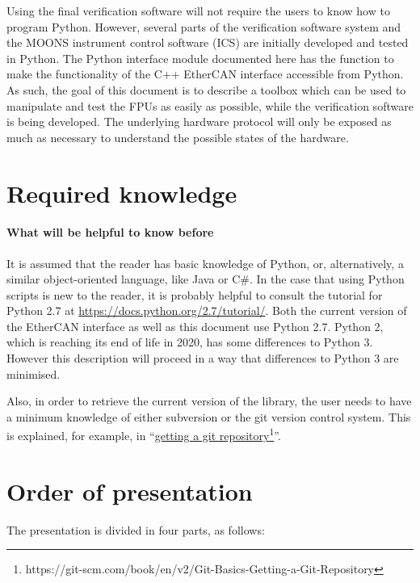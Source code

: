 \documentclass[fontsize=12,a4paper]{scrreprt}
\begin{document}
Using the final verification software will not require the users to
know how to program Python.  However, several parts of the
verification software system and the MOONS instrument control software
(ICS) are initially developed and tested in Python.  The Python
interface module documented here has the function to make the
functionality of the C++ EtherCAN interface accessible from Python. As
such, the goal of this document is to describe a toolbox which can be
used to manipulate and test the FPUs as easily as possible, while the
verification software is being developed. The underlying hardware
protocol will only be exposed as much as necessary to understand the
possible states of the hardware.

\section{Required knowledge}

\paragraph{What will be helpful to know before}
It is assumed that the reader has basic knowledge of Python, or,
alternatively, a similar object-oriented language, like Java or C\#.
In the case that using Python scripts is new to the reader, it is
probably helpful to consult the tutorial for Python 2.7 at
\url{https://docs.python.org/2.7/tutorial/}.  Both the current version
of the EtherCAN interface as well as this document use Python 2.7. Python 2, which
is reaching its end of life in 2020, has some differences to Python
3. However this description will proceed in a way that differences to
Python 3 are minimised.

  Also, in order to retrieve the current version of the
library, the user needs to have a minimum knowledge of either
subversion or the git version control system. This is explained, for
example, in
``\href{https://git-scm.com/book/en/v2/Git-Basics-Getting-a-Git-Repository}{getting
  a git
  repository}\footnote{https://git-scm.com/book/en/v2/Git-Basics-Getting-a-Git-Repository}''.

\section{Order of presentation}
The presentation is divided in four parts, as follows:
\end{document}
